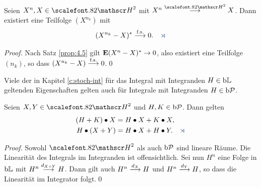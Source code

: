 \begin{korollar}
\label{cor:4.1}
Seien $X^n,X\in\cH^2$ mit $X^n \Hto X$. Dann existiert eine Teilfolge
$(X^{n_k})$ mit 
\begin{align*}
(X^{n_k} - X)^* \fsto 0.\fish
\end{align*}
\end{korollar}
\begin{proof}
Nach Satz \ref{prop:4.5} gilt $\mathbf{E} (X^n-X)^* \to 0$, also existiert eine
Teilfolge $(n_k)$, so dass $(X^{n_k}-X)\overset{\text{f.s.}}{\longrightarrow} 0$.\qed
\end{proof}


Viele der in Kapitel \ref{c:stoch-int} für das Integral mit Integranden
$H\in\mathrm{b}\mathbb{L}$ geltenden Eigenschaften gelten auch für Integrale mit  Integranden
$H\in \mathrm{b}\mathcal{P}$.

\begin{theorem}
\label{asso}
\label{prop:4.6}
Seien $X,Y \in \cH^2$ und $H,K \in \mathrm{b}\mathcal{P}$. Dann gelten
\begin{align*}
(H+K) \bullet X &= H \bullet X + K \bullet X,\\
H \bullet (X+Y) &= H \bullet X + H \bullet Y.\fish
\end{align*}
\end{theorem}
\begin{proof}
Sowohl $\HH^2$ als auch $\mathrm{b}\mathcal{P}$ sind lineare Räume. Die Linearität des
Integrals im Integranden ist offensichtlich. Sei nun $H^n$ eine Folge in $\mathrm{b}\mathbb{L}$
mit $H^n\overset{d_{X+Y}}{\longrightarrow} H$. Dann gilt auch $H^n\overset{d_{X}}{\longrightarrow}H$ und $H^n\overset{d_{Y}}{\longrightarrow} H$, so dass
die Linearität im Integrator folgt.\qed
\end{proof}

